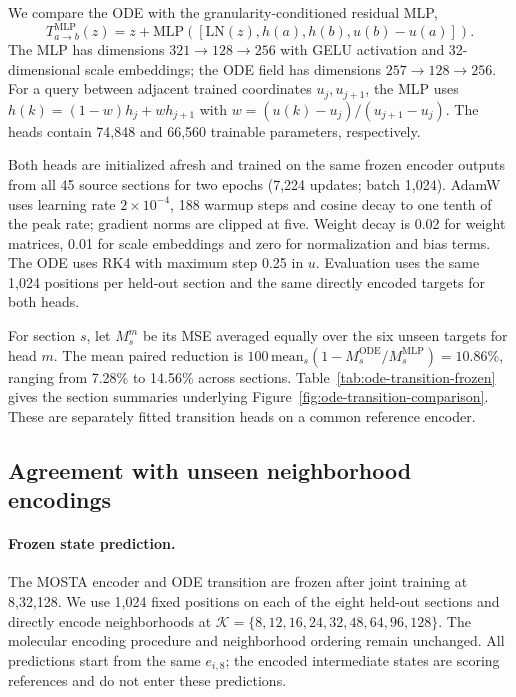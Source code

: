 We compare the ODE with the granularity-conditioned residual MLP,
\[
T^{\mathrm{MLP}}_{a\to b}(z)=z+\mathrm{MLP}\!\left([\mathrm{LN}(z),h(a),h(b),u(b)-u(a)]\right).
\]
The MLP has dimensions $321\to128\to256$ with GELU activation and 32-dimensional scale embeddings; the ODE field has dimensions $257\to128\to256$. For a query between adjacent trained coordinates $u_j,u_{j+1}$, the MLP uses $h(k)=(1-w)h_j+wh_{j+1}$ with $w=(u(k)-u_j)/(u_{j+1}-u_j)$. The heads contain 74,848 and 66,560 trainable parameters, respectively.

Both heads are initialized afresh and trained on the same frozen encoder outputs from all 45 source sections for two epochs (7,224 updates; batch 1,024). AdamW uses learning rate $2\times10^{-4}$, 188 warmup steps and cosine decay to one tenth of the peak rate; gradient norms are clipped at five. Weight decay is 0.02 for weight matrices, 0.01 for scale embeddings and zero for normalization and bias terms. The ODE uses RK4 with maximum step 0.25 in $u$. Evaluation uses the same 1,024 positions per held-out section and the same directly encoded targets for both heads.

For section $s$, let $M_s^m$ be its MSE averaged equally over the six unseen targets for head $m$. The mean paired reduction is $100\,\mathrm{mean}_s(1-M_s^{\mathrm{ODE}}/M_s^{\mathrm{MLP}})=10.86\%$, ranging from 7.28\% to 14.56\% across sections. Table~\ref{tab:ode-transition-frozen} gives the section summaries underlying Figure~\ref{fig:ode-transition-comparison}. These are separately fitted transition heads on a common reference encoder.

\begin{table}[!htbp]
\centering\small
\caption{\textbf{Matched transition heads on a shared frozen encoder.} MSE is averaged over all six unseen targets and 1,024 locations per section. The mean reduction averages the eight paired section reductions.}
\label{tab:ode-transition-frozen}

\end{table}

\subsection{Agreement with unseen neighborhood encodings}
\label{app:unseen-state-detail}

\paragraph{Frozen state prediction.}
The MOSTA encoder and ODE transition are frozen after joint training at 8,32,128. We use 1,024 fixed positions on each of the eight held-out sections and directly encode neighborhoods at $\mathcal K=\{8,12,16,24,32,48,64,96,128\}$. The molecular encoding procedure and neighborhood ordering remain unchanged. All predictions start from the same $e_{i,8}$; the encoded intermediate states are scoring references and do not enter these predictions.

